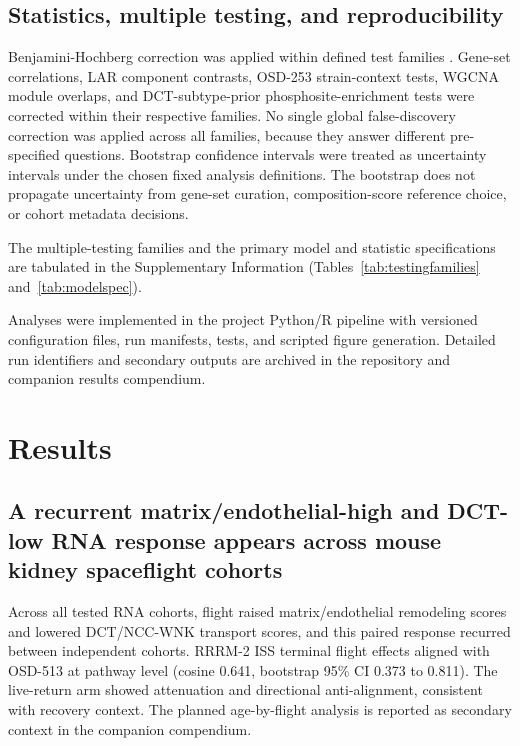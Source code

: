 \documentclass[11pt]{article}
\begin{document}
\subsection{Statistics, multiple testing, and reproducibility}

Benjamini-Hochberg correction was applied within defined test families \citep{benjamini1995controlling}. Gene-set correlations, LAR component contrasts, OSD-253 strain-context tests, WGCNA module overlaps, and DCT-subtype-prior phosphosite-enrichment tests were corrected within their respective families. No single global false-discovery correction was applied across all families, because they answer different pre-specified questions. Bootstrap confidence intervals were treated as uncertainty intervals under the chosen fixed analysis definitions. The bootstrap does not propagate uncertainty from gene-set curation, composition-score reference choice, or cohort metadata decisions.

The multiple-testing families and the primary model and statistic specifications are tabulated in the Supplementary Information (Tables~\ref{tab:testingfamilies} and~\ref{tab:modelspec}).

Analyses were implemented in the project Python/R pipeline with versioned configuration files, run manifests, tests, and scripted figure generation. Detailed run identifiers and secondary outputs are archived in the repository and companion results compendium.

\section{Results}

\subsection{A recurrent matrix/endothelial-high and DCT-low RNA response appears across mouse kidney spaceflight cohorts}

Across all tested RNA cohorts, flight raised matrix/endothelial remodeling scores and lowered DCT/NCC-WNK transport scores, and this paired response recurred between independent cohorts. RRRM-2 ISS terminal flight effects aligned with OSD-513 at pathway level (cosine 0.641, bootstrap 95\% CI 0.373 to 0.811). The live-return arm showed attenuation and directional anti-alignment, consistent with recovery context. The planned age-by-flight analysis is reported as secondary context in the companion compendium.
\end{document}
